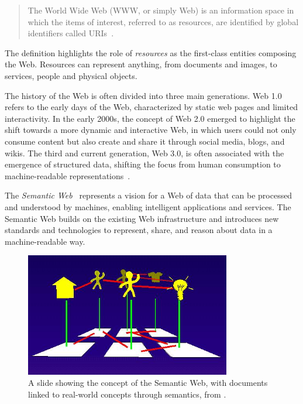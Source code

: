 \begin{quote}
The World Wide Web (WWW, or simply Web) is an information space in which the items of interest, referred to as resources, are identified by global identifiers called \acfp{URI}~\cite{wwwarch2004}.
\end{quote}

The definition highlights the role of \emph{resources} as the first-class entities composing the Web. 
%
Resources can represent anything, from documents and images, to services, people and physical objects. 

The history of the Web is often divided into three main generations.
%
Web 1.0 refers to the early days of the Web, characterized by static web pages and limited interactivity.
%
In the early 2000s, the concept of Web 2.0 emerged to highlight the shift towards a more dynamic and interactive Web, in which users could not only consume content but also create and share it through social media, blogs, and wikis.
%
The third and current generation, Web 3.0, is often associated with the emergence of structured data, shifting the focus from human consumption to machine-readable representations~\cite{Aghaei_2012}.

The \emph{Semantic Web}~\cite{berners2023semantic} represents a vision for a Web of data that can be processed and understood by machines, enabling intelligent applications and services.
%
The Semantic Web builds on the existing Web infrastructure and introduces new standards and technologies to represent, share, and reason about data in a machine-readable way. 

\begin{figure}
    \centering
    \includegraphics[width=0.8\textwidth]{figures/semantic.jpg}
    \caption{A slide showing the concept of the Semantic Web, with documents linked to real-world concepts through semantics, from \cite{bernerslee1994www94plenary}.}
    \label{fig:semantic-web-idea}
\end{figure}

